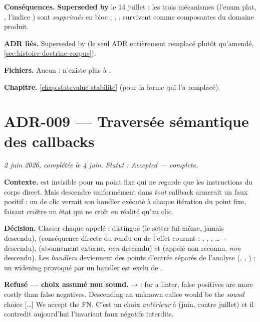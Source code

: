 \textbf{Conséquences.} \textbf{Superseded by } le 14 juillet : les
trois mécanismes (l'enum plat, , l'indice
) sont \emph{supprimés} en bloc ; ,
,  survivent comme composantes du domaine
produit.

\textbf{ADR liés.} Superseded by  (le seul ADR entièrement remplacé
plutôt qu'amendé, \cref{sec:histoire-doctrine-corpus}).

\textbf{Fichiers.} Aucun :  n'existe plus à
\code{\snapshotCommit}.

\textbf{Chapitre.} \cref{chap:statevalue-stabilite} (pour la forme qui l'a
remplacé).

\section{ADR-009 --- Traversée sémantique des callbacks}
\label{adr:9}
\noindent\textit{2 juin 2026, complétée le 4 juin. Statut : Accepted --- complete.}

\textbf{Contexte.}  est invisible pour un
point fixe qui ne regarde que les instructions du corps direct. Mais
descendre uniformément dans \emph{tout} callback armerait un faux positif : un
 de clic verrait son handler exécuté à chaque
itération du point fixe, faisant croître un état qui ne croît en réalité qu'au
clic.

\textbf{Décision.} Classer chaque appelé :  distingue
 (le setter lui-même, jamais descendu), 
(conséquence directe du rendu ou de l'effet courant : , ,
, \ldots --- descendu), 
(abonnement externe, \emph{non} descendu) et  (appelé non
reconnu, \emph{non} descendu). Les \emph{handlers} deviennent des points
d'entrée séparés de l'analyse (,
, ) ; un widening provoqué
par un handler est exclu de .


\textbf{Refusé --- choix assumé non sound.}  →  :
\og for a linter, false positives are more costly than false negatives.
Descending an unknown callee would be the \emph{sound} choice […] We accept
the FN\fg{}. C'est un choix \emph{antérieur} à  (juin, contre
juillet) et il contredit aujourd'hui l'invariant \og faux négatifs
interdits\fg{}.

